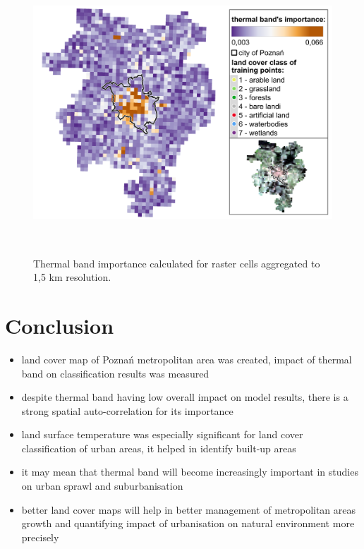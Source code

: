 \documentclass{amuthesis}
\begin{document}
\begin{figure}[H]

{\centering \includegraphics[width=5.875in,height=4.16667in]{./figures/B10_importance-spatial-ENG2.png}

}

\caption{\label{fig-rycina18}Thermal band importance calculated for
raster cells aggregated to 1,5 km resolution.}

\end{figure}


\hypertarget{conclusion}{%
\chapter{Conclusion}\label{conclusion}}

\begin{itemize}
\item
  land cover map of Poznań metropolitan area was created, impact of
  thermal band on classification results was measured
\item
  despite thermal band having low overall impact on model results, there
  is a strong spatial auto-correlation for its importance
\item
  land surface temperature was especially significant for land cover
  classification of urban areas, it helped in identify built-up areas
\item
  it may mean that thermal band will become increasingly important in
  studies on urban sprawl and suburbanisation
\item
  better land cover maps will help in better management of metropolitan
  areas growth and quantifying impact of urbanisation on natural
  environment more precisely
\end{itemize}
\end{document}
